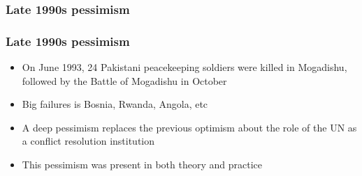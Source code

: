 \documentclass[aspectratio=43]{beamer}
\begin{document}

\begin{frame}
\frametitle{Late 1990s pessimism}
\centering


\end{frame}

\begin{frame}
\frametitle{Late 1990s pessimism}
\centering

\begin{itemize}[<+->]
  \item On June 1993, 24 Pakistani peacekeeping soldiers were killed in Mogadishu, followed by the Battle of Mogadishu in October
  \item Big failures is Bosnia, Rwanda, Angola, etc
  \item A deep pessimism replaces the previous optimism about the role of the UN as a conflict resolution institution
  \item This pessimism was present in both theory and practice
\end{itemize}

\end{frame}
\end{document}
